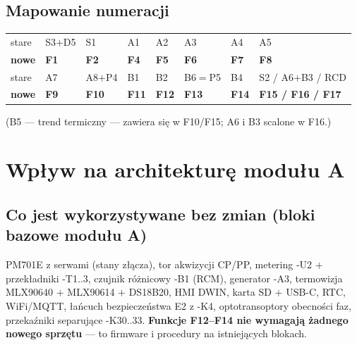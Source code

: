 \documentclass[11pt,a4paper]{article}
\begin{document}
\subsection{Mapowanie numeracji}
\label{tab:map}
\begin{center}\small
\begin{tabular}{@{}llllllll@{}}
\toprule
stare & S3$+$D5 & S1 & A1 & A2 & A3 & A4 & A5\\
\textbf{nowe} & \textbf{F1} & \textbf{F2} & \textbf{F4} & \textbf{F5} & \textbf{F6} & \textbf{F7} & \textbf{F8}\\
\midrule
stare & A7 & A8$+$P4 & B1 & B2 & B6$=$P5 & B4 & S2 / A6$+$B3 / RCD\\
\textbf{nowe} & \textbf{F9} & \textbf{F10} & \textbf{F11} & \textbf{F12} & \textbf{F13} & \textbf{F14} & \textbf{F15 / F16 / F17}\\
\bottomrule
\end{tabular}
\end{center}
(B5 --- trend termiczny --- zawiera się w F10/F15; A6 i B3 scalone w F16.)

\section{Wpływ na architekturę modułu A}
\subsection{Co jest wykorzystywane bez zmian (bloki bazowe modułu A)}
PM701E z serwami (stany złącza), tor akwizycji CP/PP, metering -U2 $+$ przekładniki -T1..3,
czujnik różnicowy -B1 (RCM), generator -A3, termowizja MLX90640 $+$ MLX90614 $+$ DS18B20,
HMI DWIN, karta SD $+$ USB-C, RTC, WiFi/MQTT, łańcuch bezpieczeństwa E2 z -K4, optotransoptory
obecności faz, przekaźniki separujące -K30..33. \textbf{Funkcje F12--F14 nie wymagają żadnego
nowego sprzętu} --- to firmware i procedury na istniejących blokach.
\end{document}
